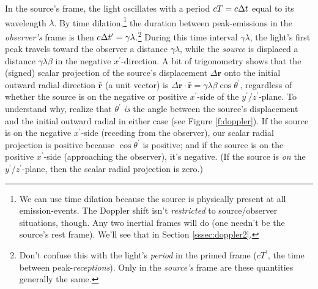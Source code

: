 \documentclass[12pt]{article}
\renewcommand{\vv}[1]{\mathbf{#1}}
\begin{document}
In the source's frame, the light oscillates with a period $cT = c \mkern.5mu \Delta t$ equal to its wavelength $\lambda$. By time dilation,\footnote{We can use time dilation because the source is physically present at all emission-events. The Doppler shift isn't \emph{restricted} to source/observer situations, though. Any two inertial frames will do (one needn't be the source's rest frame). We'll see that in Section \ref{sssec:doppler2}.} the duration between peak-emissions in the \emph{observer's} frame is then $c \mkern.5mu \Delta t^\prime = \gamma \lambda$.\footnote{Don't confuse this with the light's \emph{period} in the primed frame ($cT^\prime$, the time between peak-\emph{receptions}). Only in the \emph{source's} frame are these quantities generally the same.} During this time interval $\gamma \lambda$, the light's first peak travels toward the observer a distance $\gamma \lambda$, while the \emph{source} is displaced a distance $\gamma \lambda \beta$ in the negative $x^\prime$-direction. A bit of trigonometry shows that the (signed) scalar projection of the source's displacement $\Delta \vv r$ onto the initial outward radial direction $\vv{\hat{r}}$ (a unit vector) is $\Delta \vv r \cdot \vv{\hat{r}} = \gamma \lambda \beta \cos \theta^\prime$, regardless of whether the source is on the negative or positive $x^\prime$-side of the $y^\prime$/$z^\prime$-plane. To understand why, realize that $\theta^\prime$ \emph{is} the angle between the source's displacement and the initial outward radial in either case (see Figure \ref{f:doppler}). If the source is on the negative $x^\prime$-side (receding from the observer), our scalar radial projection is positive because $\cos \theta^\prime$ is positive; and if the source is on the positive $x^\prime$-side (approaching the observer), it's negative. (If the source is \emph{on} the $y^\prime$/$z^\prime$-plane, then the scalar radial projection is zero.)
\end{document}
